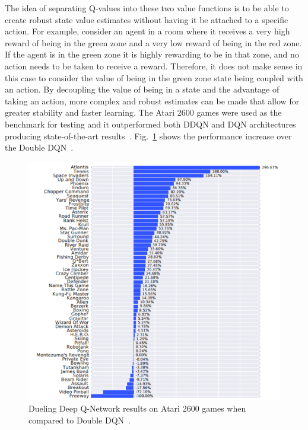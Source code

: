 \documentclass[12pt,american]{report}
\begin{document}
The idea of separating Q-values into these two value functions is to be able to create robust state value estimates without having it be attached to a specific action.  For example, consider an agent in a room where it receives a very high reward of being in the green zone and a very low reward of being in the red zone. If the agent is in the green zone it is highly rewarding to be in that zone, and no action needs to be taken to receive a reward. Therefore, it does not make sense in this case to consider the value of being in the green zone state being coupled with an action. By decoupling the value of being in a state and the advantage of taking an action, more complex and robust estimates can be made that allow for greater stability and faster learning. The Atari 2600 games were used as the benchmark for testing and it outperformed both DDQN and DQN architectures producing state-of-the-art results~\cite{wang2015dueling}. Fig.~\ref{fig:duelingdqn-results} shows the performance increase over the Double DQN~\cite{van2016deep}. 

\begin{figure}
\centering
\includegraphics[scale=0.85]{images/duelingdqn-results.png}
\caption{Dueling Deep Q-Network results on Atari 2600 games when compared to Double DQN~\cite{wang2015dueling}.}
\label{fig:duelingdqn-results}
\end{figure}
\end{document}

